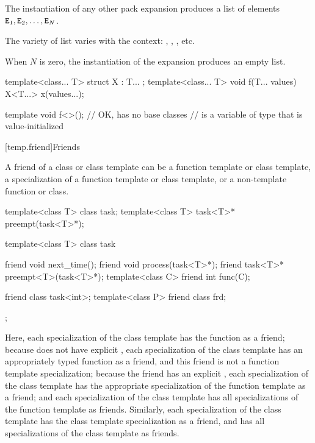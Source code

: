 \pnum
The instantiation of any other pack expansion
produces a list of elements $\texttt{\protect E}_1, \texttt{\protect E}_2, \dotsc, \texttt{\protect E}_N$.
\begin{note}
The variety of list varies with the context:
,
,
, etc.
\end{note}
When $N$ is zero, the instantiation of the expansion produces an empty list.
\begin{example}
\begin{codeblock}
template<class... T> struct X : T... { };
template<class... T> void f(T... values) {
  X<T...> x(values...);
}

template void f<>();    // OK,  has no base classes
                        //  is a variable of type  that is value-initialized
\end{codeblock}
\end{example}

[temp.friend]{Friends}

\pnum
{}%
A friend of a class or class template can be a function template or
class template, a specialization of a function template or class
template, or a non-template function or class.
\begin{example}
\begin{codeblock}
template<class T> class task;
template<class T> task<T>* preempt(task<T>*);

template<class T> class task {
  friend void next_time();
  friend void process(task<T>*);
  friend task<T>* preempt<T>(task<T>*);
  template<class C> friend int func(C);

  friend class task<int>;
  template<class P> friend class frd;
};
\end{codeblock}

Here,
each specialization of the
class template has the function
as a friend;
because
does not have explicit
,
each specialization of the
class template has an appropriately typed function
as a friend, and this friend is not a function template specialization;
because the friend
has an explicit
,
each specialization of the
class template has the appropriate specialization of the function
template
as a friend;
and each specialization of the
class template has all specializations of the function template
as friends.
Similarly,
each specialization of the
class template has the class template specialization
as a friend, and has all specializations of the class template
as friends.
\end{example}

